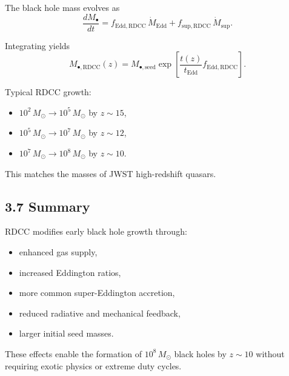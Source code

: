 \documentclass[11pt,a4paper]{article}
\begin{document}
The black hole mass evolves as
\begin{equation}
    \frac{dM_{\bullet}}{dt}
    = f_{\mathrm{Edd,RDCC}}\, \dot{M}_{\mathrm{Edd}}
      + f_{\mathrm{sup,RDCC}}\, \dot{M}_{\mathrm{sup}}.
\end{equation}

Integrating yields
\begin{equation}
    M_{\bullet,\mathrm{RDCC}}(z)
    = M_{\bullet,\mathrm{seed}}
      \exp\!\left[
        \frac{t(z)}{t_{\mathrm{Edd}}}
        f_{\mathrm{Edd,RDCC}}
      \right].
\end{equation}

Typical RDCC growth:

\begin{itemize}
    \item $10^{2}\,M_{\odot} \rightarrow 10^{5}\,M_{\odot}$ by $z \sim 15$,
    \item $10^{5}\,M_{\odot} \rightarrow 10^{7}\,M_{\odot}$ by $z \sim 12$,
    \item $10^{7}\,M_{\odot} \rightarrow 10^{8}\,M_{\odot}$ by $z \sim 10$.
\end{itemize}

This matches the masses of JWST high-redshift quasars.

\subsection*{3.7 Summary}

RDCC modifies early black hole growth through:

\begin{itemize}
    \item enhanced gas supply,
    \item increased Eddington ratios,
    \item more common super-Eddington accretion,
    \item reduced radiative and mechanical feedback,
    \item larger initial seed masses.
\end{itemize}

These effects enable the formation of $10^{8}\,M_{\odot}$ black holes by $z \sim 10$ without 
requiring exotic physics or extreme duty cycles.

\end{document}
